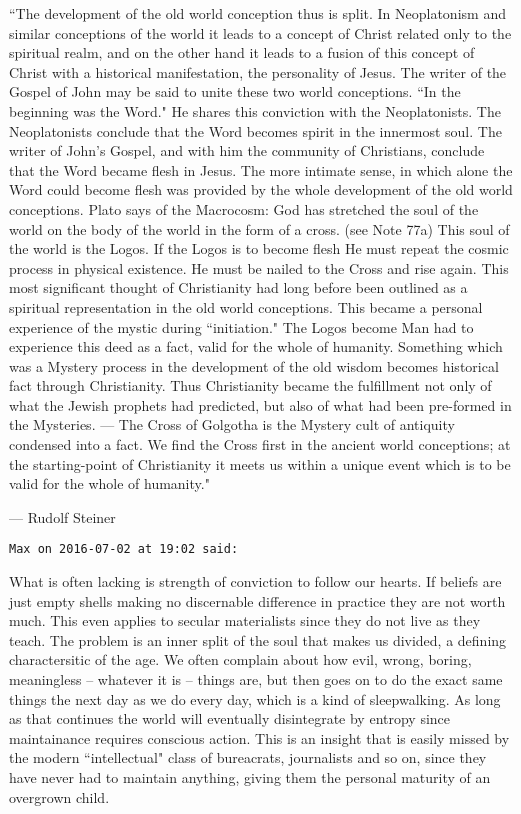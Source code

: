 \begin{footnotesize}
\begin{sffamily}
``The development of the old world conception thus is split. In Neoplatonism and similar conceptions of the world it leads to a concept of Christ related only to the spiritual realm, and on the other hand it leads to a fusion of this concept of Christ with a historical manifestation, the personality of Jesus. The writer of the Gospel of John may be said to unite these two world conceptions. ``In the beginning was the Word." He shares this conviction with the Neoplatonists. The Neoplatonists conclude that the Word becomes spirit in the innermost soul. The writer of John's Gospel, and with him the community of Christians, conclude that the Word became flesh in Jesus. The more intimate sense, in which alone the Word could become flesh was provided by the whole development of the old world conceptions. Plato says of the Macrocosm: God has stretched the soul of the world on the body of the world in the form of a cross. (see Note 77a) This soul of the world is the Logos. If the Logos is to become flesh He must repeat the cosmic process in physical existence. He must be nailed to the Cross and rise again. This most significant thought of Christianity had long before been outlined as a spiritual representation in the old world conceptions. This became a personal experience of the mystic during ``initiation." The Logos become Man had to experience this deed as a fact, valid for the whole of humanity. Something which was a Mystery process in the development of the old wisdom becomes historical fact through Christianity. Thus Christianity became the fulfillment not only of what the Jewish prophets had predicted, but also of what had been pre-formed in the Mysteries. — The Cross of Golgotha is the Mystery cult of antiquity condensed into a fact. We find the Cross first in the ancient world conceptions; at the starting-point of Christianity it meets us within a unique event which is to be valid for the whole of humanity."

— Rudolf Steiner


\hfill

\texttt{Max on 2016-07-02 at 19:02 said: }

What is often lacking is strength of conviction to follow our hearts. If beliefs are just empty shells making no discernable difference in practice they are not worth much. This even applies to secular materialists since they do not live as they teach. The problem is an inner split of the soul that makes us divided, a defining charactersitic of the age. We often complain about how evil, wrong, boring, meaningless – whatever it is – things are, but then goes on to do the exact same things the next day as we do every day, which is a kind of sleepwalking. As long as that continues the world will eventually disintegrate by entropy since maintainance requires conscious action. This is an insight that is easily missed by the modern ``intellectual" class of bureacrats, journalists and so on, since they have never had to maintain anything, giving them the personal maturity of an overgrown child.


\end{sffamily}
\end{footnotesize}
